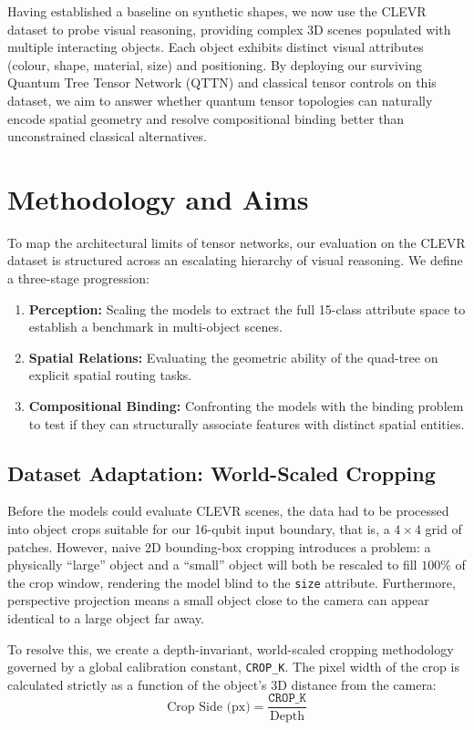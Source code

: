 \documentclass[12pt, a4paper, oneside]{report}
\begin{document}
Having established a baseline on synthetic shapes, we now use the CLEVR dataset \cite{johnson2017clevr} to probe visual reasoning, providing complex 3D scenes populated with multiple interacting objects. Each object exhibits distinct visual attributes (colour, shape, material, size) and positioning. By deploying our surviving Quantum Tree Tensor Network (QTTN) and classical tensor controls on this dataset, we aim to answer whether quantum tensor topologies can naturally encode spatial geometry and resolve compositional binding better than unconstrained classical alternatives.

\section{Methodology and Aims}
To map the architectural limits of tensor networks, our evaluation on the CLEVR dataset is structured across an escalating hierarchy of visual reasoning. We define a three-stage progression:
\begin{enumerate}
    \item \textbf{Perception:} Scaling the models to extract the full 15-class attribute space to establish a benchmark in multi-object scenes.
    \item \textbf{Spatial Relations:} Evaluating the geometric ability of the quad-tree on explicit spatial routing tasks.
    \item \textbf{Compositional Binding:} Confronting the models with the binding problem \cite{greff2020binding} to test if they can structurally associate features with distinct spatial entities.
\end{enumerate}

\subsection{Dataset Adaptation: World-Scaled Cropping}
\label{sec:crop}
Before the models could evaluate CLEVR scenes, the data had to be processed into object crops suitable for our 16-qubit input boundary, that is, a $4 \times 4$ grid of patches. However, naive 2D bounding-box cropping introduces a problem: a physically ``large'' object and a ``small'' object will both be rescaled to fill $100\%$ of the crop window, rendering the model blind to the \texttt{size} attribute. Furthermore, perspective projection means a small object close to the camera can appear identical to a large object far away.

To resolve this, we create a depth-invariant, world-scaled cropping methodology governed by a global calibration constant, \texttt{CROP\_K}. The pixel width of the crop is calculated strictly as a function of the object's 3D distance from the camera:
\begin{equation}
    \text{Crop Side (px)} = \frac{\texttt{CROP\_K}}{\text{Depth}}
\end{equation}
\end{document}
